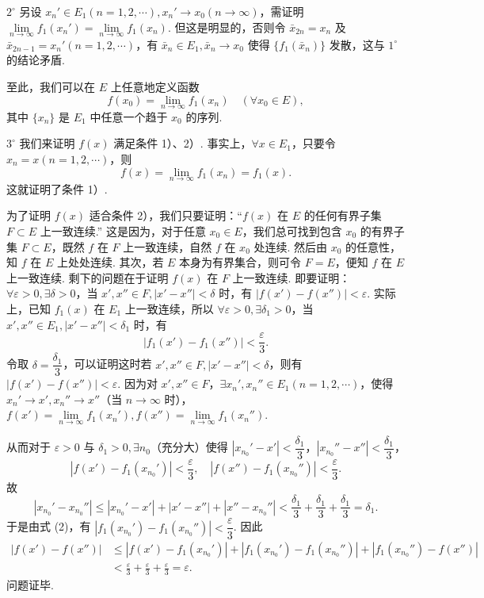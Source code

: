 \documentclass[UTF8,12pt,a4paper,fontset=fandol]{ctexart}
\begin{document}
$2^\circ$ 另设 $x_n'\in E_1(n=1,2,\cdots),x_n'\to x_0(n\to\infty)$，需证明 $\lim\limits_{n\to\infty}f_1(x_n')=\lim\limits_{n\to\infty}f_1(x_n)$. 但这是明显的，否则令 $\bar x_{2n}=x_n$ 及 $\bar x_{2n-1}=x_n'(n=1,2,\cdots)$，有 $\bar x_n\in E_1,\bar x_n\to x_0$ 使得 $\{f_1(\bar x_n)\}$ 发散，这与 $1^\circ$ 的结论矛盾.

至此，我们可以在 $E$ 上任意地定义函数
\[
  f(x_0)=\lim_{n\to\infty}f_1(x_n)\quad(\forall x_0\in E), \tag{1}
\]
其中 $\{x_n\}$ 是 $E_1$ 中任意一个趋于 $x_0$ 的序列.

$3^\circ$ 我们来证明 $f(x)$ 满足条件 1）、2）. 事实上，$\forall x\in E_1$，只要令 $x_n=x(n=1,2,\cdots)$，则
\[
  f(x)=\lim_{n\to\infty}f_1(x_n)=f_1(x).
\]
这就证明了条件 1）.

为了证明 $f(x)$ 适合条件 2），我们只要证明：“$f(x)$ 在 $E$ 的任何有界子集 $F\subset E$ 上一致连续.” 这是因为，对于任意 $x_0\in E$，我们总可找到包含 $x_0$ 的有界子集 $F\subset E$，既然 $f$ 在 $F$ 上一致连续，自然 $f$ 在 $x_0$ 处连续. 然后由 $x_0$ 的任意性，知 $f$ 在 $E$ 上处处连续. 其次，若 $E$ 本身为有界集合，则可令 $F=E$，便知 $f$ 在 $E$ 上一致连续. 剩下的问题在于证明 $f(x)$ 在 $F$ 上一致连续. 即要证明：$\forall\varepsilon>0,\exists\delta>0$，当 $x',x''\in F,|x'-x''|<\delta$ 时，有 $|f(x')-f(x'')|<\varepsilon$. 实际上，已知 $f_1(x)$ 在 $E_1$ 上一致连续，所以 $\forall\varepsilon>0,\exists\delta_1>0$，当 $x',x''\in E_1,|x'-x''|<\delta_1$ 时，有
\[
  |f_1(x')-f_1(x'')|<\frac\varepsilon3. \tag{2}
\]
令取 $\delta=\dfrac{\delta_1}{3}$，可以证明这时若 $x',x''\in F,|x'-x''|<\delta$，则有 $|f(x')-f(x'')|<\varepsilon$. 因为对 $x',x''\in F$，$\exists x_n',x_n''\in E_1(n=1,2,\cdots)$，使得 $x_n'\to x',x_n''\to x''$（当 $n\to\infty$ 时），$f(x')=\lim\limits_{n\to\infty}f_1(x_n'),f(x'')=\lim\limits_{n\to\infty}f_1(x_n'')$.

从而对于 $\varepsilon>0$ 与 $\delta_1>0,\exists n_0$（充分大）使得 $|x_{n_0}'-x'|<\dfrac{\delta_1}{3}$，$|x_{n_0}''-x''|<\dfrac{\delta_1}{3}$，
\[
  |f(x')-f_1(x_{n_0}')|<\frac\varepsilon3,\quad
  |f(x'')-f_1(x_{n_0}'')|<\frac\varepsilon3.
\]
故
\[
  |x_{n_0}'-x_{n_0}''|\le |x_{n_0}'-x'|+|x'-x''|+|x''-x_{n_0}''|
  <\frac{\delta_1}{3}+\frac{\delta_1}{3}+\frac{\delta_1}{3}=\delta_1.
\]
于是由式 (2)，有 $|f_1(x_{n_0}')-f_1(x_{n_0}'')|<\dfrac\varepsilon3$. 因此
\[
\begin{aligned}
|f(x')-f(x'')|
&\le |f(x')-f_1(x_{n_0}')|+|f_1(x_{n_0}')-f_1(x_{n_0}'')|+|f_1(x_{n_0}'')-f(x'')|\\
&<\frac\varepsilon3+\frac\varepsilon3+\frac\varepsilon3=\varepsilon.
\end{aligned}
\]
问题证毕.
\end{document}
